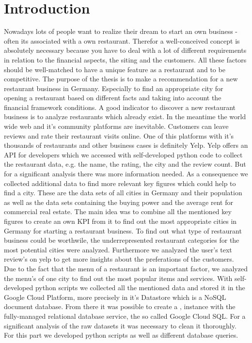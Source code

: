 \section{Introduction}
\label{sec:introduction}
Nowadays lots of people want to realize their dream to start an own business - often its associated with a own restaurant. Therefor a well-conceived concept is absolutely necessary because you have to deal with a lot of different requirements in relation to the financial aspects, the siting and the customers. All these factors should be well-matched to have a unique feature as a restaurant and to be competitive. \newline
The purpose of the thesis is to make a recommendation for a new restaurant business in Germany. Especially to find an appropriate city for opening a restaurant based on different facts and taking into account the financial framework conditions.
A good indicator to discover a new restaurant business is to analyze restaurants which already exist. In the meantime the world wide web and it's community platforms are inevitable. Customers can leave reviews and rate their restaurant visits online. One of this platforms with it's thousands of restaurants and other business cases is definitely Yelp. Yelp offers an API for developers which we accessed with self-developed python code to collect the restaurant data, e.g. the name, the rating, the city and the review count. But for a significant analysis there was more information needed. As a consequence we collected additional data to find more relevant key figures which could help to find a city. These are the data sets of all cities in Germany and their population as well as the data sets containing the buying power and the average rent for commercial real estate. The main idea was to combine all the mentioned key figures to create an own \ac{KPI} from it to find out the most appropriate cities in Germany for starting a restaurant business. To find out what type of restaurant business could be worthwile, the underrepresented restaurant categories for the most potential cities were analyzed. Furthermore we analyzed the user's text review's on yelp to get more insights about the preferations of the customers. Due to the fact that the menu of a restaurant is an important factor, we analyzed the menu's of one city to find out the most popular items and services. With self-developed python scripts we collected all the mentioned data and stored it in the Google Cloud Platform, more precisely in it's Datastore which is a NoSQL document database. From there it was possible to create a \pg{}‚ instance with the fully-managed relational database service, the so called Google Cloud SQL. For a significant analysis of the raw datasets it was necessary to clean it thoroughly. For this part we developed python scripts as well as different database queries. \newline
